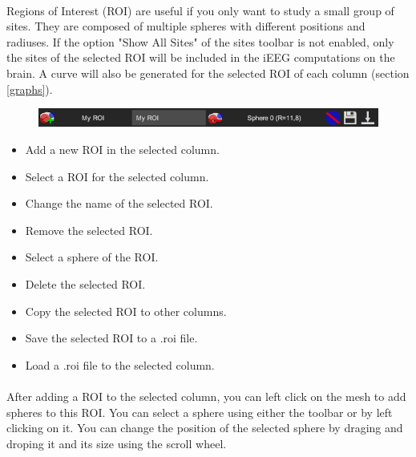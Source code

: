 \documentclass[a4paper]{article}
\begin{document}
\paragraph{} Regions of Interest (ROI) are useful if you only want to study a small group of sites. They are composed of multiple spheres with different positions and radiuses. If the option "Show All Sites" of the sites toolbar is not enabled, only the sites of the selected ROI will be included in the iEEG computations on the brain. A curve will also be generated for the selected ROI of each column (section \ref{graphs}).
\begin{figure}[H]
\begin{center}
\includegraphics[scale=0.5]{ROI.png}
\end{center}
\end{figure}
\begin{itemize}
\item Add a new ROI in the selected column.
\item Select a ROI for the selected column.
\item Change the name of the selected ROI.
\item Remove the selected ROI.
\item Select a sphere of the ROI.
\item Delete the selected ROI.
\item Copy the selected ROI to other columns.
\item Save the selected ROI to a .roi file.
\item Load a .roi file to the selected column.
\end{itemize}
\paragraph{} After adding a ROI to the selected column, you can left click on the mesh to add spheres to this ROI. You can select a sphere using either the toolbar or by left clicking on it. You can change the position of the selected sphere by draging and droping it and its size using the scroll wheel.
\end{document}
